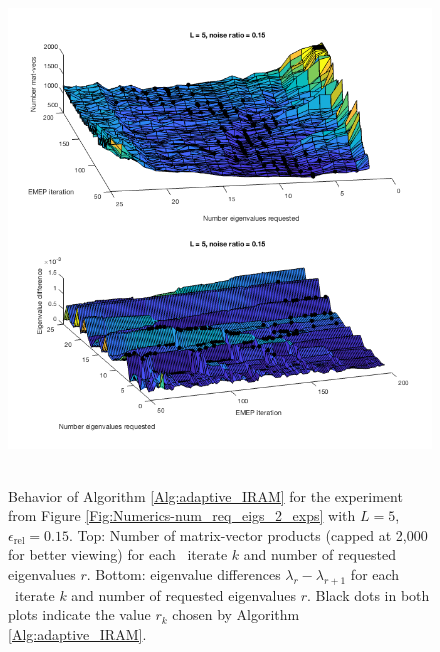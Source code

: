 \begin{figure}[H]
\centering
\hbox{\hspace{-0.2cm} \includegraphics[scale=0.65]{Numerics-surf_num_mvs_and_eig_diffs_1} }\vspace{0.0cm}
	\caption{Behavior of Algorithm \ref{Alg:adaptive_IRAM} for the experiment from Figure \ref{Fig:Numerics-num_req_eigs_2_exps} with $L=5$, $\epsilon_\text{rel}=0.15$.  Top: Number of matrix-vector products (capped at 2,000 for better viewing) for each \emep \ iterate $k$ and number of requested eigenvalues $r$. Bottom: eigenvalue differences $\lambda_r - \lambda_{r+1}$ for each \emep \ iterate $k$ and number of requested eigenvalues $r$.  Black dots in both plots indicate the value $r_k$ chosen by Algorithm \ref{Alg:adaptive_IRAM}.}
\label{Fig:Numerics-surf_mvs_eig_diffs_1}
\end{figure}



